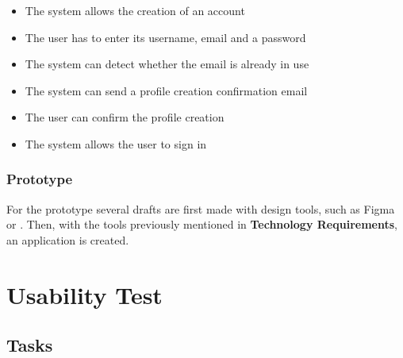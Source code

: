 \begin{itemize}
    \item The system allows the creation of an account
    \item The user has to enter its username, email and a password
    \item The system can detect whether the email is already in use
    \item The system can send a profile creation confirmation email
    \item The user can confirm the profile creation
    \item The system allows the user to sign in
\end{itemize}

\subsubsection*{Prototype}

For the prototype several drafts are first made with design tools, such as Figma or . Then,
with the tools previously mentioned in \textbf{Technology Requirements}, an application is created.

\section*{Usability Test}
\label{appendix:usability_tests}

\subsection*{Tasks}

